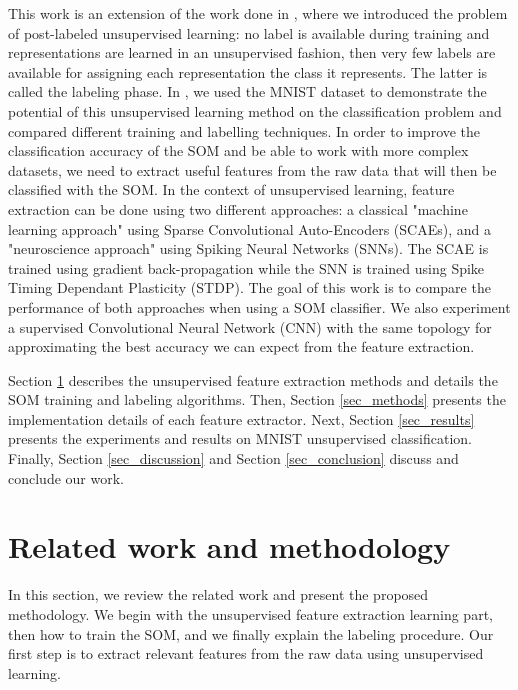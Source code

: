 \documentclass[runningheads]{llncs}
\begin{document}
This work is an extension of the work done in \cite{khacef2019self-organizing_neurons}, where we introduced the problem of post-labeled unsupervised learning: no label is available during training and representations are learned in an unsupervised fashion, then very few labels are available for assigning each representation the class it represents. The latter is called the labeling phase. In \cite{khacef2019self-organizing_neurons}, we used the MNIST dataset \cite{lecun1998mnist} to demonstrate the potential of this unsupervised learning method on the classification problem and compared different training and labelling techniques.
In order to improve the classification accuracy of the SOM and be able to work with more complex datasets, we need to extract useful features from the raw data that will then be classified with the SOM. In the context of unsupervised learning, feature extraction can be done using two different approaches: a classical "machine learning approach" using Sparse Convolutional Auto-Encoders (SCAEs), and a "neuroscience approach" using Spiking Neural Networks (SNNs). The SCAE is trained using gradient back-propagation while the SNN is trained using Spike Timing Dependant Plasticity (STDP). The goal of this work is to compare the performance of both approaches when using a SOM classifier. We also experiment a supervised Convolutional Neural Network (CNN) with the same topology for approximating the best accuracy we can expect from the feature extraction. 

Section \ref{sec_state-of-art} describes the unsupervised feature extraction methods and details the SOM training and labeling algorithms. Then, Section \ref{sec_methods} presents the implementation details of each feature extractor. Next, Section \ref{sec_results} presents the experiments and results on MNIST unsupervised classification. Finally, Section \ref{sec_discussion} and Section \ref{sec_conclusion} discuss and conclude our work.



\section{Related work and methodology}
\label{sec_state-of-art}
In this section, we review the related work and present the proposed methodology. We begin with the unsupervised feature extraction learning part, then how to train the SOM, and we finally explain the labeling procedure.
Our first step is to extract relevant features from the raw data using unsupervised learning.
\end{document}
